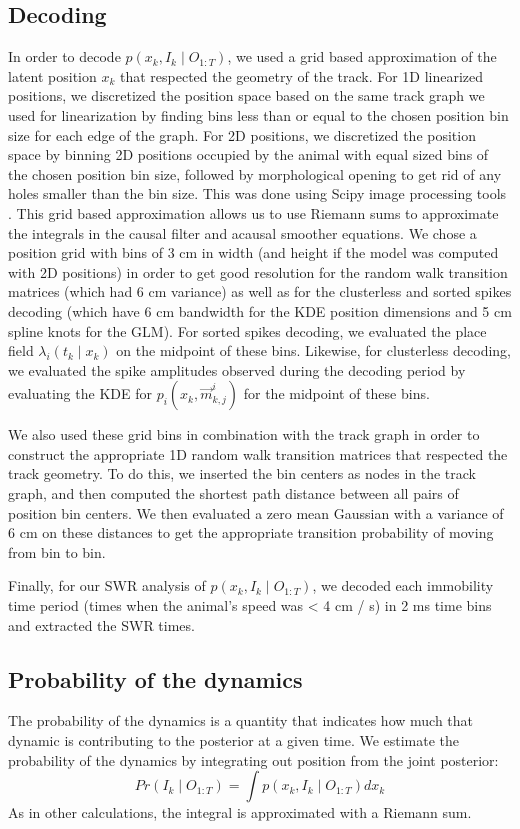 \documentclass[9pt,lineno]{elife}
\begin{document}
\subsection*{Decoding}
In order to decode $p(x_{k}, I_{k} \mid O_{1:T})$, we used a grid based approximation of the latent position $x_k$ that respected the geometry of the track. For 1D linearized positions, we discretized the position space based on the same track graph we used for linearization by finding bins less than or equal to the chosen position bin size for each edge of the graph. For 2D positions, we discretized the position space by binning 2D positions occupied by the animal with equal sized bins of the chosen position bin size, followed by morphological opening to get rid of any holes smaller than the bin size. This was done using Scipy image processing tools \citep{SciPy1.0ContributorsSciPyfundamentalalgorithms2020}. This grid based approximation allows us to use Riemann sums to approximate the integrals in the causal filter and acausal smoother equations. We chose a position grid with bins of 3 cm in width (and height if the model was computed with 2D positions) in order to get good resolution for the random walk transition matrices (which had 6 cm variance) as well as for the clusterless and sorted spikes decoding (which have 6 cm bandwidth for the KDE position dimensions and 5 cm spline knots for the GLM). For sorted spikes decoding, we evaluated the place field $\lambda_{i}(t_{k} \mid x_{k})$ on the midpoint of these bins. Likewise, for clusterless decoding, we evaluated the spike amplitudes observed during the decoding period by evaluating the KDE for $p_{i}(x_k, \vec{m}^i_{k,j})$ for the midpoint of these bins.

We also used these grid bins in combination with the track graph in order to construct the appropriate 1D random walk transition matrices that respected the track geometry. To do this, we inserted the bin centers as nodes in the track graph, and then computed the shortest path distance between all pairs of position bin centers. We then evaluated a zero mean Gaussian with a variance of 6 cm on these distances to get the appropriate transition probability of moving from bin to bin.

Finally, for our SWR analysis of $p(x_{k}, I_{k} \mid O_{1:T})$, we decoded each immobility time period (times when the animal's speed was < 4 cm / s) in 2 ms time bins and extracted the SWR times.

\subsection*{Probability of the dynamics}
The probability of the dynamics is a quantity that indicates how much that dynamic is contributing to the posterior at a given time. We estimate the probability of the dynamics by integrating out position from the joint posterior:
$$Pr(I_{k} \mid O_{1:T}) = \int p(x_{k}, I_{k} \mid O_{1:T}) dx_{k}$$
As in other calculations, the integral is approximated with a Riemann sum.
\end{document}
